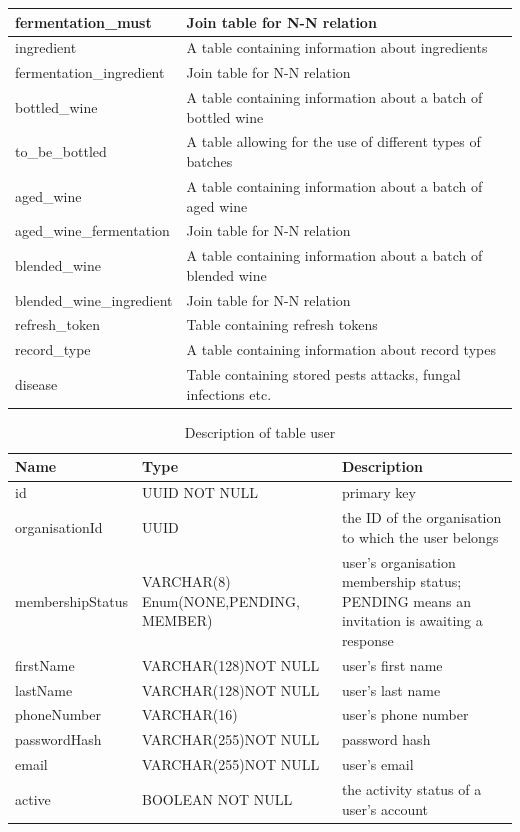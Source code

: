 \begin{longtable}{|m{}|m{}|}
	\hline
	fermentation\_must & Join table for N-N relation\\
	\hline
	ingredient & A table containing information about ingredients\\
	\hline
	fermentation\_ingredient & Join table for N-N relation\\
	\hline
	bottled\_wine & A table containing information about a batch of  bottled wine\\
	\hline
	to\_be\_bottled & A table allowing for the use of different types of batches\\
	\hline
	aged\_wine & A table containing information about a batch of  aged wine\\
	\hline
	aged\_wine\_fermentation & Join table for N-N relation\\
	\hline
	blended\_wine & A table containing information about a batch of blended wine\\
	\hline
	blended\_wine\_ingredient & Join table for N-N relation\\
	\hline
	refresh\_token & Table containing refresh tokens\\
	\hline
	record\_type & A table containing information about record types\\
	\hline
	disease & Table containing stored pests attacks, fungal infections etc.\\
	\hline
\end{longtable}
\FloatBarrier
\begin{table}[th]
	\centering
	\caption{Description of table user}
	\label{tab:first_table_description}
	\begin{tabular}{|m{}|m{}|m{}|}
		\hline
		Name & Type & Description  \\ \hline
		id & UUID NOT NULL & primary key\\ \hline
		organisationId & UUID & the ID of the organisation to which the user belongs\\ \hline
		membershipStatus & VARCHAR(8) Enum(NONE,\newline PENDING, MEMBER) & user's organisation membership status; PENDING means an invitation is awaiting a response\\ \hline
		firstName & VARCHAR(128)\newline NOT NULL & user's first name\\ \hline
		lastName & VARCHAR(128)\newline NOT NULL & user's last name\\ \hline
		phoneNumber & VARCHAR(16) & user's phone number\\ \hline
		passwordHash & VARCHAR(255)\newline NOT NULL & password hash\\ \hline
		email & VARCHAR(255)\newline NOT NULL & user's email\\ \hline
		active & BOOLEAN NOT NULL & the activity status of a user's account\\ \hline
	\end{tabular}
\end{table}
